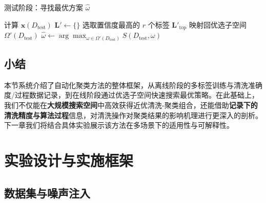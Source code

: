 \documentclass[10pt]{article} %
\numberwithin{equation}{section}
\begin{document}
\begin{algorithm}[t]
\small
\setlength{\tabcolsep}{6pt}
\renewcommand{\arraystretch}{1.2}
\caption{测试阶段：寻找最优方案 \(\hat{\omega}\)}
\label{alg:test-phase}

计算 $\mathbf{x}(D_{\text{test}})$\;
$\mathbf{L}' \leftarrow \{\}$\;
选取置信度最高的 $r$ 个标签 $\mathbf{L}'_{\mathrm{top}}$\;
映射回优选子空间 $\Omega'(D_{\text{test}})$\;
$\hat{\omega} \leftarrow \arg\max_{\omega \in \Omega'(D_{\text{test}})}S(D_{\text{test}}, \omega)$\;
\KwRet{$\hat{\omega}$}
\end{algorithm}

\subsection{小结}
本节系统介绍了自动化聚类方法的整体框架，从离线阶段的多标签训练与清洗准确度/过程数据记录，到在线阶段通过优选子空间快速搜索最优策略。在此基础上，我们不仅能在\textbf{大规模搜索空间}中高效获得近优清洗-聚类组合，还能借助\textbf{记录下的清洗精度与算法过程}信息，对清洗操作对聚类结果的影响机理进行更深入的剖析。下一章我们将结合具体实验展示该方法在多场景下的适用性与可解释性。


\section{实验设计与实施框架}

\subsection{数据集与噪声注入}
\label{sec:datasets}
\end{document}
